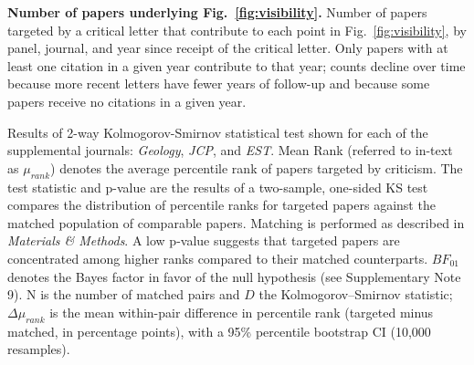 \documentclass[12pt]{article} %
\def\methods{\textit{Materials \& Methods}}
\begin{document}
\begin{table}[ht]
\small
\centering
\caption{
\textbf{Number of papers underlying Fig.~\ref*{fig:visibility}.}
Number of papers targeted by a critical letter that contribute to each point in Fig.~\ref*{fig:visibility}, by panel, journal, and year since receipt of the critical letter.
Only papers with at least one citation in a given year contribute to that year; counts decline over time because more recent letters have fewer years of follow-up and because some papers receive no citations in a given year.
}
\label{si:tab:visibility-n}
%
\end{table}



\begin{table}[ht]
\scriptsize
\centering
\caption{
Results of 2-way Kolmogorov-Smirnov statistical test shown for each of the supplemental journals: \textit{Geology}, \textit{JCP}, and \textit{EST}.
Mean Rank (referred to in-text as $\mu_{rank}$) denotes the average percentile rank of papers targeted by criticism.
The test statistic and p-value are the results of a two-sample, one-sided KS test compares the distribution of percentile ranks for targeted papers against the matched population of comparable papers. 
Matching is performed as described in \methods.
A low p-value suggests that targeted papers are concentrated among higher ranks compared to their matched counterparts.
$BF_{01}$ denotes the Bayes factor in favor of the null hypothesis (see Supplementary Note 9).
 N is the number of matched pairs and $D$ the Kolmogorov–Smirnov statistic; $\Delta\mu_{rank}$ is the mean within-pair difference in percentile rank (targeted minus matched, in percentage points), with a 95\% percentile bootstrap CI (10,000 resamples).
}
\label{si:table:density_tests_2ks_extra} 
%
\end{table}
\end{document}
